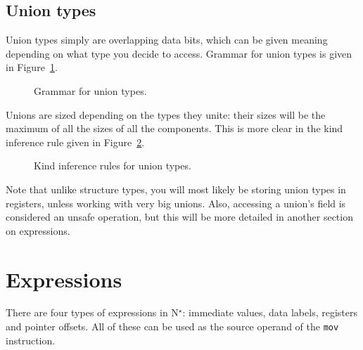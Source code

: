 \subsection{Union types}\label{subsec:nstar-common-ts-unions}

Union types simply are overlapping data bits, which can be given meaning depending on what type you decide to access.
Grammar for union types is given in Figure~\ref{fig:nstar-common-ts-unions-syntax}.

\begin{figure}[htb]
  \centering

  \caption{Grammar for union types.}
  \label{fig:nstar-common-ts-unions-syntax}
\end{figure}

Unions are sized depending on the types they unite: their sizes will be the maximum of all the sizes of all the components.
This is more clear in the kind inference rule given in Figure~\ref{fig:nstar-common-ts-unions-kindrules}.

\begin{figure}[H]
  \centering

  \begin{prooftree}
  \end{prooftree}

  \caption{Kind inference rules for union types.}
  \label{fig:nstar-common-ts-unions-kindrules}
\end{figure}

Note that unlike structure types, you will most likely be storing union types in registers, unless working with very big unions.
Also, accessing a union's field is considered an unsafe operation, but this will be more detailed in another section on expressions.

\section{Expressions}\label{sec:nstar-common-expressions}

There are four types of expressions in N$^\star$: immediate values, data labels, registers and pointer offsets.
All of these can be used as the source operand of the \texttt{mov} instruction.


